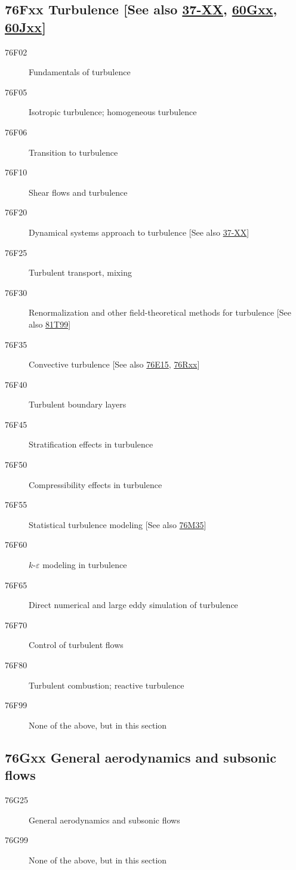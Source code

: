 \subsection*{76Fxx  Turbulence [See also \hyperref[37-XX]{37-XX}, \hyperref[60Gxx]{60Gxx}, \hyperref[60Jxx]{60Jxx}] }\label{76Fxx}
\begin{description} 
\item [76F02]\label{76F02} Fundamentals of turbulence
\item [76F05]\label{76F05} Isotropic turbulence; homogeneous turbulence
\item [76F06]\label{76F06} Transition to turbulence
\item [76F10]\label{76F10} Shear flows and turbulence
\item [76F20]\label{76F20} Dynamical systems approach to turbulence [See also \hyperref[37-XX]{37-XX}]
\item [76F25]\label{76F25} Turbulent transport, mixing
\item [76F30]\label{76F30} Renormalization and other field-theoretical methods for turbulence [See also \hyperref[81T99]{81T99}]
\item [76F35]\label{76F35} Convective turbulence [See also \hyperref[76E15]{76E15}, \hyperref[76Rxx]{76Rxx}]
\item [76F40]\label{76F40} Turbulent boundary layers
\item [76F45]\label{76F45} Stratification effects in turbulence
\item [76F50]\label{76F50} Compressibility effects in turbulence
\item [76F55]\label{76F55} Statistical turbulence modeling [See also \hyperref[76M35]{76M35}]
\item [76F60]\label{76F60} $k$-$\varepsilon$ modeling in turbulence
\item [76F65]\label{76F65} Direct numerical and large eddy simulation of turbulence
\item [76F70]\label{76F70} Control of turbulent flows
\item [76F80]\label{76F80} Turbulent combustion; reactive turbulence
\item [76F99]\label{76F99} None of the above, but in this section
\end{description}
\subsection*{76Gxx  General aerodynamics and subsonic flows }\label{76Gxx}
\begin{description}  
\item [76G25]\label{76G25} General aerodynamics and subsonic flows
\item [76G99]\label{76G99} None of the above, but in this section
\end{description}
